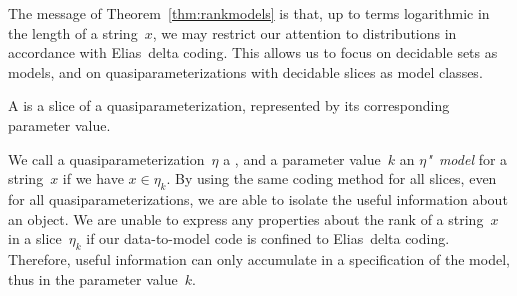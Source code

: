 The message of Theorem~\ref{thm:rankmodels} is that, up to terms logarithmic in the length of a string~$x$, we may restrict our attention to distributions in accordance with Elias~delta coding.
This allows us to focus on decidable sets as models, and on quasiparameterizations with decidable slices as model classes.
\begin{definition}
  A  is a slice of a quasiparameterization, represented by its corresponding parameter value.
\end{definition}

We call a quasiparameterization~$\eta$ a , and a parameter value~$k$ an \emph{$\eta$"~model} for a string~$x$ if we have $x \in \eta_k$.
By using the same coding method for all slices, even for all quasiparameterizations, we are able to isolate the useful information about an object.
We are unable to express any properties about the rank of a string~$x$ in a slice~$\eta_k$ if our data-to-model code is confined to Elias~delta coding.
Therefore, useful information can only accumulate in a specification of the model, thus in the parameter value~$k$.

